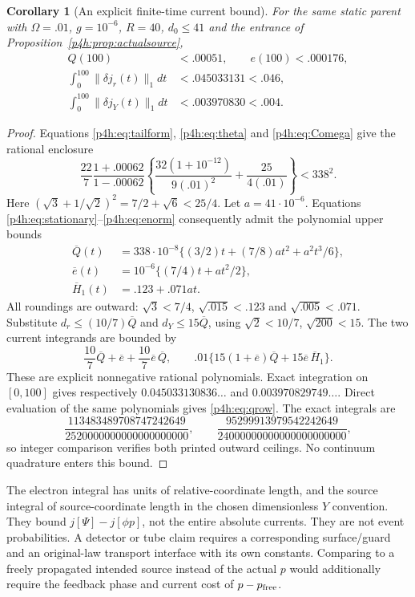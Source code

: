 \documentclass[11pt]{article}
\numberwithin{equation}{section}
\newtheorem{corollary}[theorem]{Corollary}
\theoremstyle{definition}
\theoremstyle{remark}
\begin{document}
\begin{corollary}[An explicit finite-time current bound]
\label{p4h:cor:currents}
For the same static parent with
$\Omega=.01$, $g=10^{-6}$, $R=40$, $d_0\leq41$ and
the entrance of Proposition~\ref{p4h:prop:actualsource},
\begin{align}
 Q(100)&<.00051,\qquad e(100)<.000176,\label{p4h:eq:qrow}\\
 \int_0^{100}\|\delta j_r(t)\|_1dt
 &<.045033131<.046,\label{p4h:eq:electronrow}\\
 \int_0^{100}\|\delta j_Y(t)\|_1dt
 &<.003970830<.004.\label{p4h:eq:sourcerow}
\end{align}
\end{corollary}
\begin{proof}
Equations \eqref{p4h:eq:tailform}, \eqref{p4h:eq:theta}
and \eqref{p4h:eq:Comega} give the rational enclosure
\[
 \frac{22}{7}\frac{1+.00062}{1-.00062}
 \left\{\frac{32(1+10^{-12})}{9(.01)^2}
                       +\frac{25}{4(.01)}\right\}<338^2 .
\]
Here $(\sqrt3+1/\sqrt2)^2=7/2+\sqrt6<25/4$.
Let $a=41\cdot10^{-6}$. Equations
\eqref{p4h:eq:stationary}--\eqref{p4h:eq:enorm} consequently
admit the polynomial upper bounds
\begin{align*}
 \overline Q(t)&=338\cdot10^{-8}
           \{(3/2)t+(7/8)at^2+a^2t^3/6\},\\
 \overline e(t)&=10^{-6}\{(7/4)t+at^2/2\},\\
 \overline H_1(t)&=.123+.071at.
\end{align*}
All roundings are outward:
$\sqrt3<7/4$, $\sqrt{.015}<.123$ and
$\sqrt{.005}<.071$.
Substitute $d_r\leq(10/7)\overline Q$ and
$d_Y\leq15\overline Q$, using
$\sqrt2<10/7$, $\sqrt{200}<15$.
The two current integrands are bounded by
\[
 \frac{10}{7}\overline Q+\overline e+
                  \frac{10}{7}\overline e\,\overline Q,
 \qquad
 .01\{15(1+\overline e)\overline Q+
                                  15\overline e\,\overline H_1\}.
\]
These are explicit nonnegative rational polynomials.
Exact integration on $[0,100]$ gives respectively
$0.045033130836\ldots$ and $0.003970829749\ldots$.
Direct evaluation of the same polynomials gives
\eqref{p4h:eq:qrow}. The exact integrals are
\[
 \frac{113483489708747242649}{2520000000000000000000},
 \qquad
 \frac{95299913979542242649}{24000000000000000000000},
\]
so integer comparison verifies both printed outward ceilings.
No continuum quadrature enters this bound.
\end{proof}

The electron integral has units of relative-coordinate length,
and the source integral of source-coordinate length in the
chosen dimensionless $Y$ convention. They bound
$j[\Psi]-j[\phi p]$, not the entire absolute currents.
They are not event probabilities. A detector or tube claim
requires a corresponding surface/guard and an original-law
transport interface with its own constants. Comparing to a
freely propagated intended source instead of the actual $p$
would additionally require the feedback phase and current
cost of $p-p_{\rm free}$.
\end{document}
